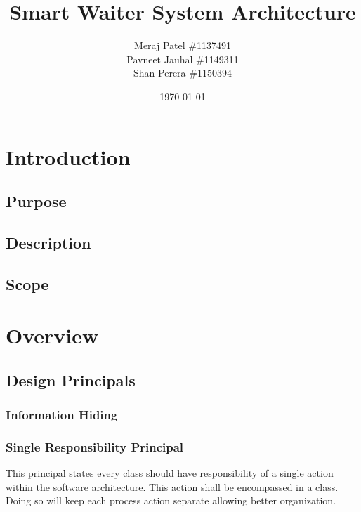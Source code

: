 \documentclass[12pt, titlepage]{article}
\begin{document}
\title{Smart Waiter System Architecture} 
\author{Meraj Patel \#1137491 \\ Pavneet Jauhal \#1149311\\ Shan Perera \#1150394}
\date{\today}
\maketitle

\tableofcontents 

\listoffigures

\listoftables

\section{Introduction}

\subsection{Purpose}

\subsection{Description}

\subsection{Scope}

\section{Overview}

\subsection{Design Principals}
\subsubsection{Information Hiding}

\subsubsection{Single Responsibility Principal}
This principal states every class should have responsibility of a single action within the software architecture. This action shall be encompassed in a class. Doing so will keep each process action separate allowing better organization. 
\end{document}
